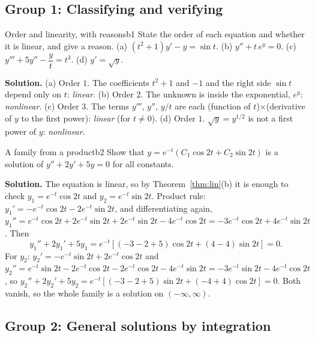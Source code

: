 \documentclass[11pt]{article}
\begin{document}
\subsection*{Group 1: Classifying and verifying}

\begin{exmp}{Order and linearity, with reasons}{b1}
State the order of each equation and whether it is linear, and give a reason. (a) $(t^2+1)y'-y=\sin t$. (b) $y''+t\,e^{y}=0$. (c) $y'''+5y''-\dfrac{y}{t}=t^3$. (d) $y'=\sqrt{y}$.

\textbf{Solution.} (a) Order $1$. The coefficients $t^2+1$ and $-1$ and the right side $\sin t$ depend only on $t$: \emph{linear}. (b) Order $2$. The unknown is inside the exponential, $e^y$: \emph{nonlinear}. (c) Order $3$. The terms $y''',\,y'',\,y/t$ are each (function of $t$)$\times$(derivative of $y$ to the first power): \emph{linear} (for $t\ne0$). (d) Order $1$. $\sqrt y=y^{1/2}$ is not a first power of $y$: \emph{nonlinear}.
\end{exmp}

\begin{exmp}{A family from a product}{b2}
Show that $y=e^{-t}\left(C_1\cos2t+C_2\sin2t\right)$ is a solution of $y''+2y'+5y=0$ for all constants.

\textbf{Solution.} The equation is linear, so by Theorem~\ref{thm:lin}(b) it is enough to check $y_1=e^{-t}\cos2t$ and $y_2=e^{-t}\sin2t$. Product rule: $y_1'=-e^{-t}\cos2t-2e^{-t}\sin2t$, and differentiating again, $y_1''=e^{-t}\cos2t+2e^{-t}\sin2t+2e^{-t}\sin2t-4e^{-t}\cos2t=-3e^{-t}\cos2t+4e^{-t}\sin2t$. Then
\[
y_1''+2y_1'+5y_1=e^{-t}\left[(-3-2+5)\cos2t+(4-4)\sin2t\right]=0 .
\]
For $y_2$: $y_2'=-e^{-t}\sin2t+2e^{-t}\cos2t$ and $y_2''=e^{-t}\sin2t-2e^{-t}\cos2t-2e^{-t}\cos2t-4e^{-t}\sin2t=-3e^{-t}\sin2t-4e^{-t}\cos2t$, so $y_2''+2y_2'+5y_2=e^{-t}\left[(-3-2+5)\sin2t+(-4+4)\cos2t\right]=0$.
Both vanish, so the whole family is a solution on $(-\infty,\infty)$.
\end{exmp}

\subsection*{Group 2: General solutions by integration}
\end{document}
